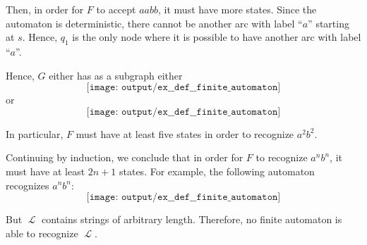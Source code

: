 \begin{example}
\begin{thmenum}
    Then, in order for \( F \) to accept \( aabb \), it must have more states. Since the automaton is deterministic, there cannot be another arc with label \enquote{\( a \)} starting at \( s \). Hence, \( q_1 \) is the only node where it is possible to have another arc with label \enquote{\( a \)}.

    Hence, \( G \) either has as a subgraph either
    \begin{equation*}
      \texttt{[image: output/ex\_\_def\_\_finite\_automaton]}
    \end{equation*}
    or
    \begin{equation*}
      \texttt{[image: output/ex\_\_def\_\_finite\_automaton]}
    \end{equation*}

    In particular, \( F \) must have at least five states in order to recognize \( a^2 b^2 \).

    Continuing by induction, we conclude that in order for \( F \) to recognize \( a^n b^n \), it must have at least \( 2n + 1 \) states. For example, the following automaton recognizes \( a^n b^n \):
    \begin{equation*}
      \texttt{[image: output/ex\_\_def\_\_finite\_automaton]}
    \end{equation*}

    But \( \mscrL \) contains strings of arbitrary length. Therefore, no finite automaton is able to recognize \( \mscrL \).
  \end{thmenum}
\end{example}

